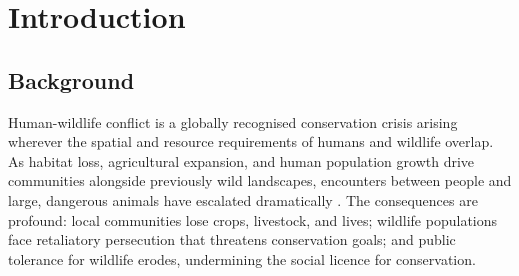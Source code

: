 \documentclass[12pt,a4paper]{article}
\begin{document}
\begin{abstract}
        This research aims to design, develop, and validate an autonomous geofence-triggered
        implantable sedative-delivery device that can immediately immobilize habitual wildlife
        trespassers upon crossing a pre-defined virtual boundary, without requiring human
        intervention at the moment of immobilization. The device is intended for subcutaneous
        implantation in recidivist conflict animals, particularly big cats, hippopotami, and members
        of the Big Five. The research will proceed in three phases: device engineering, large-animal
        biocompatibility assessment, and controlled field trials. The ultimate outcome is a
        technology that reduces human casualty rates, minimises crop and property damage,
        decreases retaliatory animal killings, and represents a paradigm shift from reactive to
        proactive HWC management.
    \end{abstract}

    \newpage
    \tableofcontents
    \newpage

    \section{Introduction}

    \subsection{Background}

    Human-wildlife conflict is a globally recognised conservation crisis arising wherever the
    spatial and resource requirements of humans and wildlife overlap. As habitat loss,
    agricultural expansion, and human population growth drive communities alongside
    previously wild landscapes, encounters between people and large, dangerous animals have
    escalated dramatically \cite{muliya2026}. The consequences are profound: local communities
    lose crops, livestock, and lives; wildlife populations face retaliatory persecution that
    threatens conservation goals; and public tolerance for wildlife erodes, undermining the
    social licence for conservation.
\end{document}
